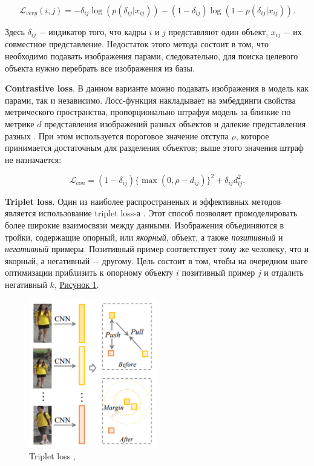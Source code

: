  \begin{equation}
     \mathcal L_{very}(i, j) = - \delta_{ij} \log \left( p(\delta_{ij} | x_{ij}) \right) - (1 - \delta_{ij}) \log \left( 1 - p(\delta_{ij} | x_{ij}) \right).
 \end{equation}

 Здесь $\delta_{ij}$ $-$ индикатор того, что кадры $i$ и $j$ представляют один объект, $x_{ij}$ $-$ их совместное представление. Недостаток этого метода состоит в том, что необходимо подавать изображения парами, следовательно, для поиска целевого объекта нужно перебрать все изображения из базы.

 \textbf{Contrastive loss}. В данном варианте можно подавать изображения в модель как парами, так и независимо. Лосс-функция накладывает на эмбеддинги свойства метрического пространства, пропорционально штрафуя модель за близкие по метрике $d$ представления изображений разных объектов и далекие представления разных \cite{hadsell2006dimensionality}. При этом используется пороговое значение отступа $\rho$, которое принимается достаточным для разделения объектов; выше этого значения штраф не назначается:

 \begin{equation}
     \mathcal L_{con} = (1 - \delta_{ij}) \{ \max (0, \rho - d_{ij}) \}^2 + \delta_{ij} d_{ij}^2.
 \end{equation}

 \textbf{Triplet loss}. Один из наиболее распространеных и эффективных методов является использование triplet loss-а \cite{schroff2015facenet}. Этот способ позволяет промоделировать более широкие взаимосвязи между данными. Изображения объединяются в тройки, содержащие опорный, или \textit{якорный}, объект, а также \textit{позитивный} и \textit{негативный} примеры. Позитивный пример соответствует тому же человеку, что и якорный, а негативный $-$ другому. Цель состоит в том, чтобы на очередном шаге оптимизации приблизить к опорному объекту $i$ позитивный пример $j$ и отдалить негативный $k$, \hyperref[fig:triplet_loss]{Рисунок \ref*{fig:triplet_loss}}.

 \begin{figure}[ht]
     \centering
     \includegraphics[width=0.5\textwidth]{images/closed_world/triplet_loss.png}
     \caption{Triplet loss \cite{schroff2015facenet}, \cite{ye2021deep}}
     \label{fig:triplet_loss}
 \end{figure}


